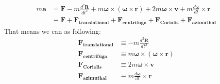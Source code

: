 \documentclass[11pt, draft]{article}
\begin{document}
\begin{equation}
    \begin{aligned}
        m\mathbf{a} &= \mathbf{F} - m\frac{d^2\mathbf{R}}{dt^2} + m\boldsymbol{\omega} \times (\boldsymbol{\omega} \times \mathbf{r}) + 2m\boldsymbol{\omega} \times \mathbf{v} + m\frac{d\boldsymbol{\omega}}{dt} \times \mathbf{r}\\
        &\equiv \mathbf{F} + \mathbf{F_{translational}} + \mathbf{F_{centrifuga}} + \mathbf{F_{Coriolis}} + \mathbf{F_{azimuthal}} 
    \end{aligned}\label{eq:10.10}
\end{equation}
That means we can  as following:
\begin{equation}
    \begin{aligned}
        \mathbf{F_{translational}} &\equiv -m\frac{d^2\mathbf{R}}{dt^2}\\
        \mathbf{F_{centrifuga}} &\equiv m\boldsymbol{\omega} \times (\boldsymbol{\omega} \times \mathbf{r})\\
        \mathbf{F_{Coriolis}} &\equiv 2m\boldsymbol{\omega} \times \mathbf{v}\\
        \mathbf{F_{azimuthal}} &\equiv m\frac{d\boldsymbol{\omega}}{dt} \times \mathbf{r}
    \end{aligned}\label{eq:10.11}
\end{equation}
\end{document}
